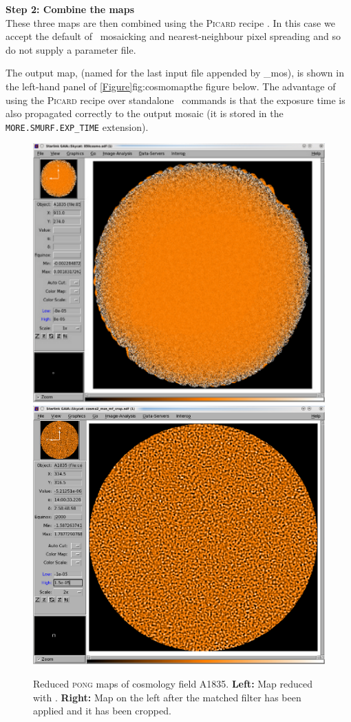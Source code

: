 \documentclass[11pt,oneside,chapters]{starlink}
\begin{document}
\textbf{Step 2: Combine the maps}\\
These three maps are then combined using the \textsc{Picard} recipe
. In
this case we accept the default of \wcsmosaic\ mosaicking and
nearest-neighbour pixel spreading and so do not supply a parameter
file.
\begin{terminalv}
\end{terminalv}
The output map,  (named for the last input file
appended by \_mos), is shown in the left-hand panel of
\cref{Figure}{fig:cosmomap}{the figure below}. The advantage of using the
\textsc{Picard} recipe over standalone \Kappa\ commands is that the exposure
time is also propagated correctly to the output mosaic (it is stored
in the \texttt{MORE.SMURF.EXP\_TIME} extension).
\\

\begin{figure}
\includegraphics[width=0.48\linewidth]{sc21_850cosmo_bf}
\hspace{2mm}
\includegraphics[width=0.48\linewidth]{sc21_850cosmo_mf_crop}
\caption[Cosmology field with the matched filter applied]{
  Reduced \textsc{pong} maps of cosmology field A1835. \textbf{Left:}
  Map reduced with .
  \textbf{Right:} Map on the left after the matched filter has been
  applied and it has been cropped.\label{fig:cosmomap}
}
\end{figure}
\end{document}
